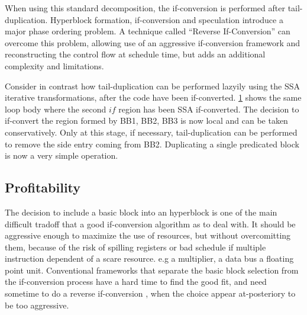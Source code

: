 \begin{figure}[h]
{    \label{fig:hyper4}}
\end{figure}

When using this standard decomposition, the if-conversion is performed after tail-duplication. Hyperblock formation, if-conversion and speculation introduce a major phase ordering problem. A technique called ``Reverse If-Conversion'' \cite{August:1999:PRI:326224.325595} can overcome this problem, allowing use of an aggressive if-conversion framework and reconstructing the control flow at schedule time, but adds an additional complexity and limitations.

Consider in contrast how tail-duplication can be performed lazyily using the SSA iterative transformations, after the code have been if-converted. \ref{fig:hyper4} shows the same loop body where the second $if$ region has been SSA if-converted. The decision to if-convert the region formed by {BB1, BB2, BB3} is now local and can be taken conservatively. Only at this stage, if necessary, tail-duplication can be performed to remove the side entry coming from BB2. Duplicating a single predicated block is now a very simple operation.

\subsection{Profitability}

The decision to include a basic block into an hyperblock is one of the main difficult tradoff that a good if-conversion algorithm as to deal with. It should be aggressive enough to maximize the use of resources, but without overcomitting them, because of the risk of spilling registers or bad schedule if multiple instruction dependent of a scare resource. e.g a multiplier, a data bus a floating point unit. Conventional frameworks that separate the basic block selection from the if-conversion process have a hard time to find the good fit, and need sometime to do a reverse if-conversion \cite{August:1999:PRI:326224.325595}, when the choice appear at-posteriory to be too aggressive.

